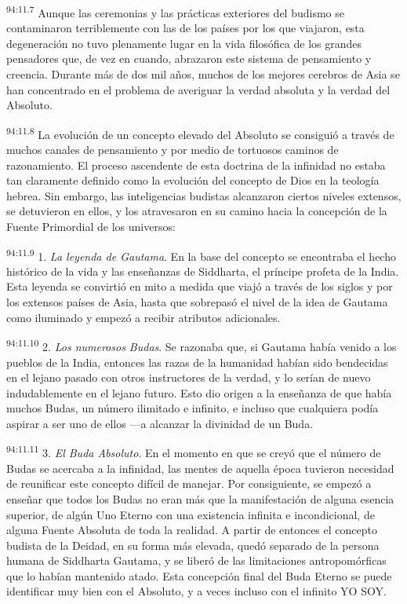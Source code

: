 \par
\textsuperscript{94:11.7} Aunque las ceremonias y las prácticas exteriores del budismo se contaminaron terriblemente con las de los países por los que viajaron, esta degeneración no tuvo plenamente lugar en la vida filosófica de los grandes pensadores que, de vez en cuando, abrazaron este sistema de pensamiento y creencia. Durante más de dos mil años, muchos de los mejores cerebros de Asia se han concentrado en el problema de averiguar la verdad absoluta y la verdad del Absoluto.

\par
\textsuperscript{94:11.8} La evolución de un concepto elevado del Absoluto se consiguió a través de muchos canales de pensamiento y por medio de tortuosos caminos de razonamiento. El proceso ascendente de esta doctrina de la infinidad no estaba tan claramente definido como la evolución del concepto de Dios en la teología hebrea. Sin embargo, las inteligencias budistas alcanzaron ciertos niveles extensos, se detuvieron en ellos, y los atravesaron en su camino hacia la concepción de la Fuente Primordial de los universos:

\par
\textsuperscript{94:11.9} 1. \textit{La leyenda de Gautama}. En la base del concepto se encontraba el hecho histórico de la vida y las enseñanzas de Siddharta, el príncipe profeta de la India. Esta leyenda se convirtió en mito a medida que viajó a través de los siglos y por los extensos países de Asia, hasta que sobrepasó el nivel de la idea de Gautama como iluminado y empezó a recibir atributos adicionales.

\par
\textsuperscript{94:11.10} 2. \textit{Los numerosos Budas}. Se razonaba que, si Gautama había venido a los pueblos de la India, entonces las razas de la humanidad habían sido bendecidas en el lejano pasado con otros instructores de la verdad, y lo serían de nuevo indudablemente en el lejano futuro. Esto dio origen a la enseñanza de que había muchos Budas, un número ilimitado e infinito, e incluso que cualquiera podía aspirar a ser uno de ellos ---a alcanzar la divinidad de un Buda.

\par
\textsuperscript{94:11.11} 3. \textit{El Buda Absoluto}. En el momento en que se creyó que el número de Budas se acercaba a la infinidad, las mentes de aquella época tuvieron necesidad de reunificar este concepto difícil de manejar. Por consiguiente, se empezó a enseñar que todos los Budas no eran más que la manifestación de alguna esencia superior, de algún Uno Eterno con una existencia infinita e incondicional, de alguna Fuente Absoluta de toda la realidad. A partir de entonces el concepto budista de la Deidad, en su forma más elevada, quedó separado de la persona humana de Siddharta Gautama, y se liberó de las limitaciones antropomórficas que lo habían mantenido atado. Esta concepción final del Buda Eterno se puede identificar muy bien con el Absoluto, y a veces incluso con el infinito YO SOY.

